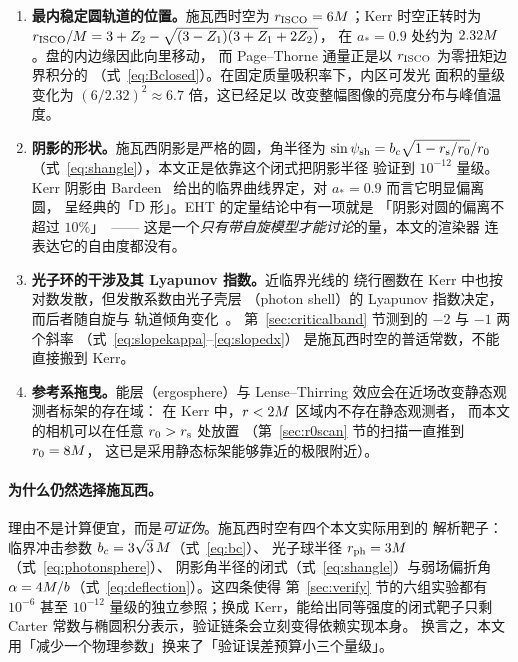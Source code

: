 \begin{enumerate}[leftmargin=1.8em,itemsep=2pt,topsep=3pt]
  \item \textbf{最内稳定圆轨道的位置。}施瓦西时空为
        $r_{\mathrm{ISCO}}=6M$；Kerr 时空正转时为
        $r_{\mathrm{ISCO}}/M=3+Z_2-\sqrt{(3-Z_1)(3+Z_1+2Z_2)}$，
        在 $a_\ast=0.9$ 处约为 $2.32M$。盘的内边缘因此向里移动，
        而 Page--Thorne 通量正是以 $r_{\mathrm{ISCO}}$ 为零扭矩边界积分的
        （式~\eqref{eq:Bclosed}）。在固定质量吸积率下，内区可发光
        面积的量级变化为 $(6/2.32)^2\approx6.7$ 倍，这已经足以
        改变整幅图像的亮度分布与峰值温度。
  \item \textbf{阴影的形状。}施瓦西阴影是严格的圆，角半径为
        $\sin\psi_{\rm sh}=b_{c}\sqrt{1-r_{\mathrm s}/r_0}/r_0$
        （式~\eqref{eq:shangle}），本文正是依靠这个闭式把阴影半径
        验证到 $10^{-12}$ 量级。Kerr 阴影由 Bardeen~\cite{bardeen1973}
        给出的临界曲线界定，对 $a_\ast=0.9$ 而言它明显偏离圆，
        呈经典的「D 形」。EHT 的定量结论中有一项就是
        「阴影对圆的偏离不超过 $10\%$」~\cite{eht2019,eht2022}——
        这是一个\emph{只有带自旋模型才能讨论}的量，本文的渲染器
        连表达它的自由度都没有。
  \item \textbf{光子环的干涉及其 Lyapunov 指数。}近临界光线的
        绕行圈数在 Kerr 中也按对数发散，但发散系数由光子壳层
        （photon shell）的 Lyapunov 指数决定，而后者随自旋与
        轨道倾角变化~\cite{johnson2020,gralla2020}。
        第~\ref{sec:criticalband} 节测到的 $-2$ 与 $-1$ 两个斜率
        （式~\eqref{eq:slopekappa}--\eqref{eq:slopedx}）
        是施瓦西时空的普适常数，不能直接搬到 Kerr。
  \item \textbf{参考系拖曳。}能层（ergosphere）与
        Lense--Thirring 效应会在近场改变静态观测者标架的存在域：
        在 Kerr 中，$r<2M$ 区域内不存在静态观测者，
        而本文的相机可以在任意 $r_0>r_{\mathrm s}$ 处放置
        （第~\ref{sec:r0scan} 节的扫描一直推到 $r_0=8M$，
        这已是采用静态标架能够靠近的极限附近）。
\end{enumerate}

\paragraph{为什么仍然选择施瓦西。}
理由不是计算便宜，而是\emph{可证伪}。施瓦西时空有四个本文实际用到的
解析靶子：临界冲击参数 $b_{c}=3\sqrt3\,M$（式~\eqref{eq:bc}）、
光子球半径 $r_{\mathrm{ph}}=3M$（式~\eqref{eq:photonsphere}）、
阴影角半径的闭式（式~\eqref{eq:shangle}）与弱场偏折角
$\alpha=4M/b$（式~\eqref{eq:deflection}）。这四条使得
第~\ref{sec:verify} 节的六组实验都有 $10^{-6}$ 甚至 $10^{-12}$
量级的独立参照；换成 Kerr，能给出同等强度的闭式靶子只剩
Carter 常数与椭圆积分表示，验证链条会立刻变得依赖实现本身。
换言之，本文用「减少一个物理参数」换来了「验证误差预算小三个量级」。

